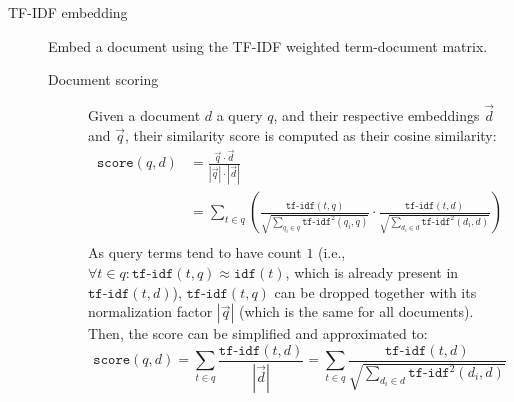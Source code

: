 \begin{description}
    \item[TF-IDF embedding] 
        Embed a document using the TF-IDF weighted term-document matrix.

        \begin{description}
            \item[Document scoring]
                Given a document $d$ a query $q$, and their respective embeddings $\vec{d}$ and $\vec{q}$, their similarity score is computed as their cosine similarity:
                \[
                    \begin{split}
                        \texttt{score}(q, d) &= \frac{\vec{q} \cdot \vec{d}}{|\vec{q}| \cdot |\vec{d}|} \\
                        &= \sum_{t \in q} \left( \frac{\texttt{tf-idf}(t, q)}{\sqrt{\sum_{q_i \in q} \texttt{tf-idf}^2(q_i, q)}} \cdot \frac{\texttt{tf-idf}(t, d)}{\sqrt{\sum_{d_i \in d} \texttt{tf-idf}^2(d_i, d)}} \right) \\
                    \end{split}
                \]
                As query terms tend to have count $1$ (i.e., $\forall t \in q: \texttt{tf-idf}(t, q) \approx \texttt{idf}(t)$, which is already present in $\texttt{tf-idf}(t, d)$), $\texttt{tf-idf}(t, q)$ can be dropped together with its normalization factor $|\vec{q}|$ (which is the same for all documents). Then, the score can be simplified and approximated to:
                \[ \texttt{score}(q, d) = \sum_{t \in q} \frac{\texttt{tf-idf}(t, d)}{|\vec{d}|} = \sum_{t \in q} \frac{\texttt{tf-idf}(t, d)}{\sqrt{\sum_{d_i \in d} \texttt{tf-idf}^2(d_i, d)}} \]


\end{description}
\end{description}
